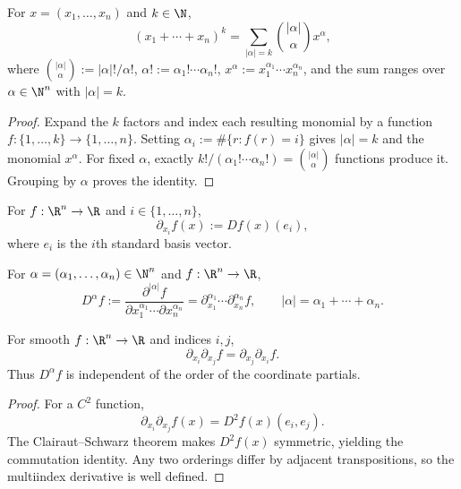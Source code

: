 \begin{proposition}
\label{ex:multinomial-theorem}
\leanok
For $x = (x_1, \ldots, x_n)$ and $k \in \N$,
\[
\left(x_1 + \cdots + x_n\right)^k
= \sum_{|\alpha|=k} \binom{|\alpha|}{\alpha}x^\alpha,
\]
where $\binom{|\alpha|}{\alpha} := |\alpha|!/\alpha!$,
$\alpha! := \alpha_1!\cdots\alpha_n!$, $x^\alpha :=
x_1^{\alpha_1}\cdots x_n^{\alpha_n}$, and the sum ranges over
$\alpha \in \N^n$ with $|\alpha|=k$.
\end{proposition}
\begin{proof}
\leanok
\sketch
Expand the $k$ factors and index each resulting monomial by a function
$f : \{1,\ldots,k\} \to \{1,\ldots,n\}$. Setting
$\alpha_i := \#\{r : f(r)=i\}$ gives $|\alpha|=k$ and the monomial
$x^\alpha$. For fixed $\alpha$, exactly
$k!/ (\alpha_1!\cdots\alpha_n!) = \binom{|\alpha|}{\alpha}$ functions
produce it. Grouping by $\alpha$ proves the identity.
\end{proof}

\begin{definition}
\label{def:partial-derivative}
\leanok
For $f : \R^n \to \R$ and $i \in \{1,\ldots,n\}$,
\[
\partial_{x_i}f(x) := Df(x)(e_i),
\]
where $e_i$ is the $i$th standard basis vector.
\end{definition}

\begin{definition}
\label{def:multiindex-partial-derivative}
\leanok
For $\alpha=(\alpha_1,\ldots,\alpha_n)\in\N^n$ and
$f : \R^n \to \R$,
\[
D^\alpha f := \frac{\partial^{|\alpha|}f}
 {\partial x_1^{\alpha_1}\cdots\partial x_n^{\alpha_n}}
= \partial_{x_1}^{\alpha_1}\cdots\partial_{x_n}^{\alpha_n}f,
\qquad |\alpha|=\alpha_1+\cdots+\alpha_n.
\]
\end{definition}

\begin{proposition}
\label{prop:clairaut-partial-commute}
\leanok
For smooth $f : \R^n \to \R$ and indices $i,j$,
\[
\partial_{x_i}\partial_{x_j}f=\partial_{x_j}\partial_{x_i}f.
\]
Thus $D^\alpha f$ is independent of the order of the coordinate partials.
\end{proposition}
\begin{proof}
\leanok
\sketch
For a $C^2$ function,
\[
\partial_{x_i}\partial_{x_j}f(x)=D^2f(x)(e_i,e_j).
\]
The Clairaut--Schwarz theorem makes $D^2f(x)$ symmetric, yielding the
commutation identity. Any two orderings differ by adjacent transpositions,
so the multiindex derivative is well defined.
\end{proof}

